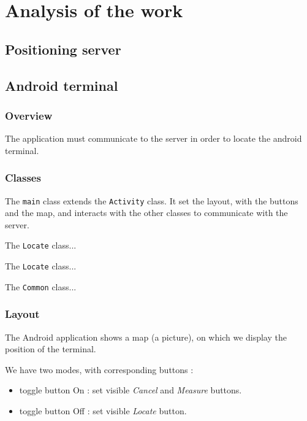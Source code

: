 \section{Analysis of the work}

\subsection{Positioning server}

\newpage
\subsection{Android terminal}

\subsubsection{Overview}

The application must communicate to the server in order to locate the android
terminal. 

\subsubsection{Classes}

The \verb+main+ class extends the \verb+Activity+ class. It set the layout, with
the buttons and the map, and interacts with the other classes to communicate
with the server.

The \verb+Locate+ class...

The \verb+Locate+ class...

The \verb+Common+ class...

\subsubsection{Layout}

The Android application shows a map (a picture), on which we display the
position of the terminal.

We have two modes, with corresponding buttons :

\begin{itemize}
    \item toggle button On : set visible \textit{Cancel} and \textit{Measure}
        buttons.
    \item toggle button Off : set visible \textit{Locate} button.
\end{itemize}


